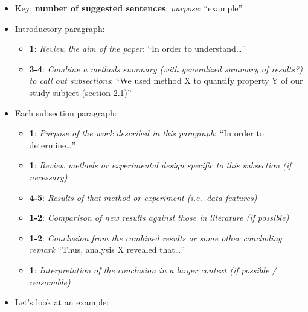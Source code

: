 \documentclass[
]{krantz}
\providecommand{\tightlist}{%
  \setlength{\itemsep}{0pt}\setlength{\parskip}{0pt}}
\begin{document}
\begin{itemize}
\item
  Key: \textbf{number of suggested sentences}: \emph{purpose}: ``example''
\item
  Introductory paragraph:

  \begin{itemize}
  \tightlist
  \item
    \textbf{1}: \emph{Review the aim of the paper}: ``In order to understand\ldots{}''
  \item
    \textbf{3-4}: \emph{Combine a methods summary (with generalized summary of results?) to call out subsections}: ``We used method X to quantify property Y of our study subject (section 2.1)''
  \end{itemize}
\item
  Each subsection paragraph:

  \begin{itemize}
  \tightlist
  \item
    \textbf{1}: \emph{Purpose of the work described in this paragraph}: ``In order to determine\ldots{}''
  \item
    \textbf{1}: \emph{Review methods or experimental design specific to this subsection (if necessary)}
  \item
    \textbf{4-5}: \emph{Results of that method or experiment (i.e.~data features)}
  \item
    \textbf{1-2}: \emph{Comparison of new results against those in literature (if possible)}
  \item
    \textbf{1-2}: \emph{Conclusion from the combined results or some other concluding remark} ``Thus, analysis X revealed that\ldots{}''
  \item
    \textbf{1}: \emph{Interpretation of the conclusion in a larger context (if possible / reasonable)}
  \end{itemize}
\item
  Let's look at an example:
\end{itemize}
\end{document}
